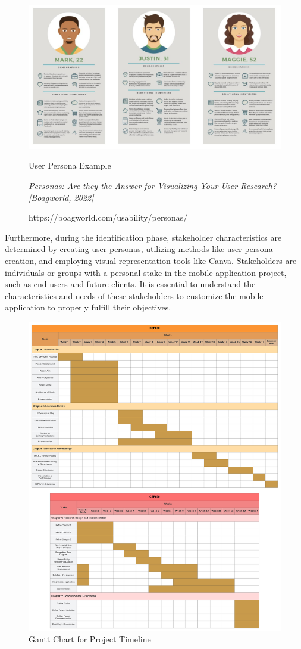 \begin{figure}[h]
    \centering
    \includegraphics[width=0.8\linewidth]{mainmatter/images/exampleuserpersona.jpg}
	\caption{User Persona Example}
    \caption*{\textit{Personas: Are they the Answer for Visualizing Your User Research? [Boagworld, 2022]}}
    \caption*{https://boagworld.com/usability/personas/}
    \label{fig:myfig30}
\end{figure}

Furthermore, during the identification phase, stakeholder characteristics are determined by creating user personas, utilizing methods like user persona creation, and employing visual representation tools like Canva. Stakeholders are individuals or groups with a personal stake in the mobile application project, such as end-users and future clients. It is essential to understand the characteristics and needs of these stakeholders to customize the mobile application to properly fulfill their objectives.
\pagebreak

\begin{figure}[h]
    \centering
    \includegraphics[width=0.8\linewidth]{mainmatter/images/ganttchart.png}
	\caption{Gantt Chart for Project Timeline}
    \label{fig:myfig30}
\end{figure}


